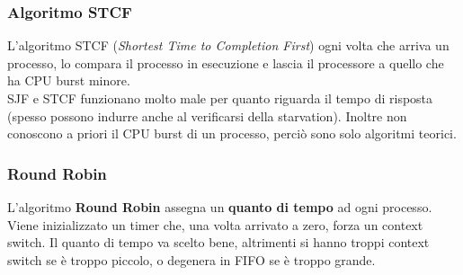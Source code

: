 \documentclass[12pt, twoside, letterpaper]{article}
\begin{document}
			\subsubsection{Algoritmo STCF}
				L'algoritmo STCF (\textit{Shortest Time to Completion First}) ogni volta che arriva un processo, lo compara il processo in esecuzione e lascia il processore a quello che ha CPU burst minore.\\
				
			SJF e STCF funzionano molto male per quanto riguarda il tempo di risposta (spesso possono indurre anche al verificarsi della starvation). Inoltre non conoscono a priori il CPU burst di un processo, perciò sono solo algoritmi teorici.
				
			\subsubsection{Round Robin}
				L'algoritmo \textbf{Round Robin} assegna un \textbf{quanto di tempo} ad ogni processo. Viene inizializzato un timer che, una volta arrivato a zero, forza un context switch. Il quanto di tempo va scelto bene, altrimenti si hanno troppi context switch se è troppo piccolo, o degenera in FIFO se è troppo grande.
			
			
\end{document}
